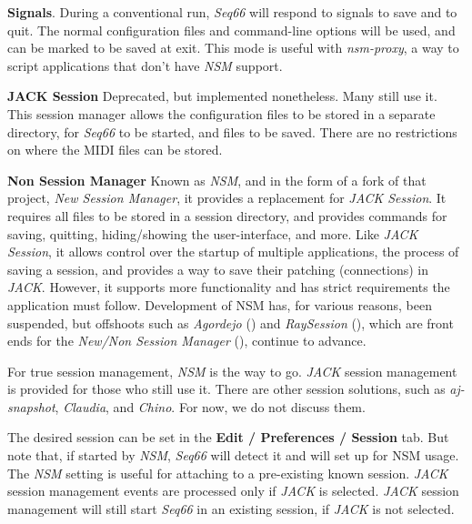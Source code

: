    \begin{enumber}
      \item \textbf{Signals}.
         During a conventional run, \textsl{Seq66} will respond
         to signals to save and to quit.
         The normal configuration files and command-line options will be
         used, and can be marked to be saved at exit.
         This mode is useful with \textsl{nsm-proxy}, a way to script
         applications that don't have \textsl{NSM} support.
      \item \textbf{JACK Session}
         Deprecated, but implemented nonetheless.
         Many still use it.
         This session manager allows the configuration files to be stored in
         a separate directory, for \textsl{Seq66} to be started, and files to
         be saved.
         There are no restrictions on where the MIDI files can be stored.
      \item \textbf{Non Session Manager}
         Known as \textsl{NSM}, and in the form of a fork of that project,
         \textsl{New Session Manager},
         it provides a replacement for \textsl{JACK Session}.
         It requires all files to be
         stored in a session directory, and provides commands for saving,
         quitting, hiding/showing the user-interface, and more.
         Like \textsl{JACK Session}, it allows control over the startup of
         multiple applications, the process of saving a session, and provides a
         way to save their patching (connections) in \textsl{JACK}.
         However, it supports more functionality and has
         strict requirements the application must follow.
         Development of NSM has, for various reasons, been suspended, but
         offshoots such as \textsl{Agordejo} (\cite{agordejo})
         and \textsl{RaySession} (\cite{raysession}), which are front ends for
         the \textsl{New/Non Session Manager} (\cite{nsm}),
         continue to advance.
   \end{enumber}

   For true session management, \textsl{NSM} is the way to go.
   \textsl{JACK} session management is provided for those who still use it.
   There are other session solutions, such as \textsl{aj-snapshot},
   \textsl{Claudia}, and \textsl{Chino}.
   For now, we do not discuss them.


   The desired session can be set in the \textbf{Edit / Preferences /
   Session} tab.  But note that, if started by \textsl{NSM}, \textsl{Seq66}
   will detect it and will set up for NSM usage.
   The \textsl{NSM} setting is
   useful for attaching to a pre-existing known session.
   \textsl{JACK} session management events are processed
   only if \textsl{JACK} is selected.
   \textsl{JACK} session management will still start \textsl{Seq66} in
   an existing session, if \textsl{JACK} is
   not selected.

